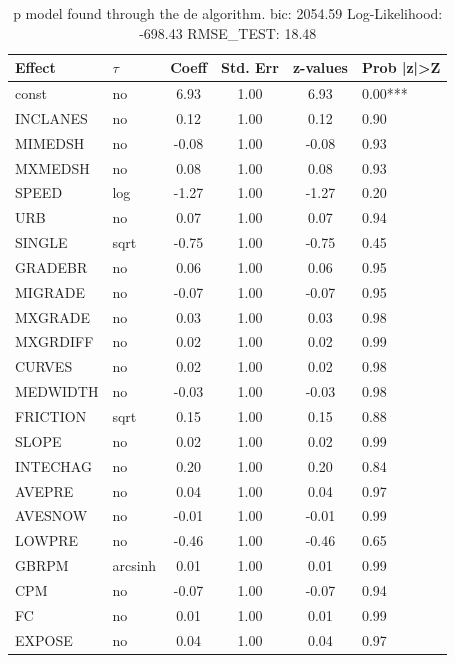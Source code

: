 \begin{table}
	\caption{p model found through the de algorithm. bic: 2054.59 Log-Likelihood: -698.43 RMSE_TEST: 18.48}
	\begin{center}
		\begin{tabular}{|l|l|c|c|c|l|}
			\hline
			Effect & $\tau$ & Coeff & Std. Err & z-values & Prob |z|>Z \\
			\hline
			const & no & 6.93 & 1.00 & 6.93 & 0.00*** \\
			\hline
			INCLANES & no & 0.12 & 1.00 & 0.12 & 0.90 \\
			\hline
			MIMEDSH & no & -0.08 & 1.00 & -0.08 & 0.93 \\
			\hline
			MXMEDSH & no & 0.08 & 1.00 & 0.08 & 0.93 \\
			\hline
			SPEED & log & -1.27 & 1.00 & -1.27 & 0.20 \\
			\hline
			URB & no & 0.07 & 1.00 & 0.07 & 0.94 \\
			\hline
			SINGLE & sqrt & -0.75 & 1.00 & -0.75 & 0.45 \\
			\hline
			GRADEBR & no & 0.06 & 1.00 & 0.06 & 0.95 \\
			\hline
			MIGRADE & no & -0.07 & 1.00 & -0.07 & 0.95 \\
			\hline
			MXGRADE & no & 0.03 & 1.00 & 0.03 & 0.98 \\
			\hline
			MXGRDIFF & no & 0.02 & 1.00 & 0.02 & 0.99 \\
			\hline
			CURVES & no & 0.02 & 1.00 & 0.02 & 0.98 \\
			\hline
			MEDWIDTH & no & -0.03 & 1.00 & -0.03 & 0.98 \\
			\hline
			FRICTION & sqrt & 0.15 & 1.00 & 0.15 & 0.88 \\
			\hline
			SLOPE & no & 0.02 & 1.00 & 0.02 & 0.99 \\
			\hline
			INTECHAG & no & 0.20 & 1.00 & 0.20 & 0.84 \\
			\hline
			AVEPRE & no & 0.04 & 1.00 & 0.04 & 0.97 \\
			\hline
			AVESNOW & no & -0.01 & 1.00 & -0.01 & 0.99 \\
			\hline
			LOWPRE & no & -0.46 & 1.00 & -0.46 & 0.65 \\
			\hline
			GBRPM & arcsinh & 0.01 & 1.00 & 0.01 & 0.99 \\
			\hline
			CPM & no & -0.07 & 1.00 & -0.07 & 0.94 \\
			\hline
			FC & no & 0.01 & 1.00 & 0.01 & 0.99 \\
			\hline
			EXPOSE & no & 0.04 & 1.00 & 0.04 & 0.97 \\

\end{tabular}
\end{center}
\end{table}
